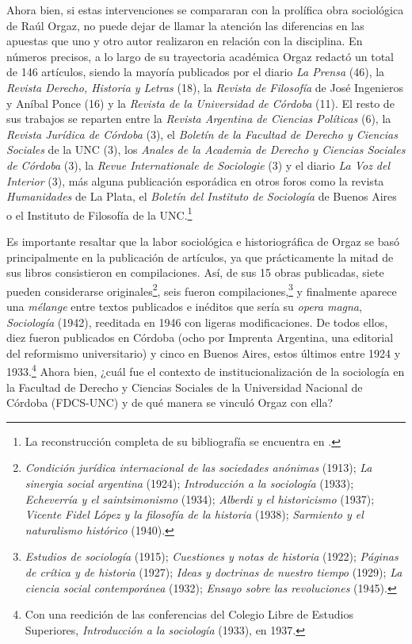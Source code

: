 Ahora bien, si estas intervenciones se compararan con la prolífica obra sociológica de Raúl Orgaz, no puede dejar de llamar la atención las diferencias en las apuestas que uno y otro autor realizaron en relación con la disciplina. En números precisos, a lo largo de su trayectoria académica Orgaz redactó un total de 146 artículos, siendo la mayoría publicados por el diario \emph{La Prensa} (46), la \emph{Revista Derecho, Historia y Letras} (18), la \emph{Revista de Filosofía} de José Ingenieros y Aníbal Ponce (16) y la \emph{Revista de la Universidad de Córdoba} (11). El resto de sus trabajos se reparten entre la \emph{Revista Argentina de Ciencias Políticas} (6), la \emph{Revista Jurídica de Córdoba} (3), el \emph{Boletín de la Facultad de Derecho y Ciencias Sociales} de la UNC (3), los \emph{Anales de la Academia de Derecho y Ciencias Sociales de Córdoba} (3), la \emph{Revue Internationale de Sociologie} (3) y el diario \emph{La Voz del Interior} (3), más alguna publicación esporádica en otros foros como la revista \emph{Humanidades} de La Plata, el \emph{Boletín del Instituto de Sociología} de Buenos Aires o el Instituto de Filosofía de la UNC.\footnote{La reconstrucción completa de su bibliografía se encuentra en \textcite{1544-ORGAZ1960}.}

Es importante resaltar que la labor sociológica e historiográfica de Orgaz se basó principalmente en la publicación de artículos, ya que prácticamente la mitad de sus libros consistieron en compilaciones. Así, de sus 15 obras publicadas, siete pueden considerarse originales\footnote{\emph{Condición jurídica internacional de las sociedades anónimas} (1913); \emph{La sinergia social argentina} (1924); \emph{Introducción a la sociología} (1933); \emph{Echeverría y el saintsimonismo} (1934); \emph{Alberdi y el historicismo} (1937); \emph{Vicente Fidel López y la filosofía de la historia} (1938); \emph{Sarmiento y el naturalismo histórico} (1940).}, seis fueron compilaciones,\footnote{\emph{Estudios de sociología} (1915); \emph{Cuestiones y notas de historia} (1922); \emph{Páginas de crítica y de historia} (1927); \emph{Ideas y doctrinas de nuestro tiempo} (1929); \emph{La ciencia social contemporánea} (1932); \emph{Ensayo sobre las revoluciones} (1945).} y finalmente aparece una \emph{mélange} entre textos publicados e inéditos que sería su \emph{opera magna}, \emph{Sociología} (1942), reeditada en 1946 con ligeras modificaciones. De todos ellos, diez fueron publicados en Córdoba (ocho por Imprenta Argentina, una editorial del reformismo universitario) y cinco en Buenos Aires, estos últimos entre 1924 y 1933.\footnote{Con una reedición de las conferencias del Colegio Libre de Estudios Superiores, \emph{Introducción a la sociología} (1933), en 1937.} Ahora bien, ¿cuál fue el contexto de institucionalización de la sociología en la Facultad de Derecho y Ciencias Sociales de la Universidad Nacional de Córdoba (FDCS-UNC) y de qué manera se vinculó Orgaz con ella?

